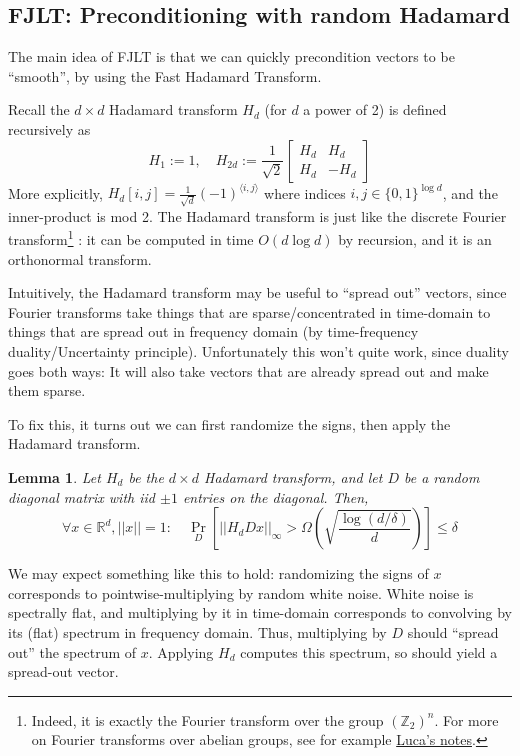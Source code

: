 \documentclass[]{article}
\newtheorem{lemma}{Lemma}
\newcommand{\1}{\mathbb{1}}
\newcommand{\x}{\times}
\newcommand{\Z}{\mathbb{Z}}
\newcommand{\R}{\mathbb{R}}
\renewcommand{\epsilon}{\varepsilon}
\newcommand{\bmqty}[1]{\begin{bmatrix}#1\end{bmatrix}}
\newcommand{\innp}[1]{\langle #1 \rangle}
\begin{document}

\subsection{FJLT: Preconditioning with random Hadamard}
The main idea of FJLT is that we can quickly precondition vectors to be
``smooth'', by using the Fast Hadamard Transform.

Recall the $d \x d$ Hadamard transform $H_d$ (for $d$ a power of 2) is defined
recursively as
$$H_1 :=  1
,\quad
H_{2d} := \frac{1}{\sqrt{2}} \bmqty{H_d & H_d\\H_d & -H_d}$$
More explicitly, $H_d[i,j] = \frac{1}{\sqrt{d}} (-1)^{\innp{i, j}}$
where indices $i,j \in \{0, 1\}^{\log d}$, and the inner-product is mod 2.
The Hadamard transform is just like the discrete Fourier transform\footnote{Indeed, it is exactly the Fourier transform over the group
    $(\Z_2)^n$. For more on Fourier transforms over abelian groups, see for
    example \href{https://lucatrevisan.wordpress.com/2016/03/16/cs294-lecture-15-abelian-cayley-graphs/}{Luca's
    notes}.}
: it can be computed in
time $O(d\log d)$ by recursion, and it is an orthonormal transform.

Intuitively, the Hadamard transform may be useful to ``spread out'' vectors,
since Fourier transforms take things that are sparse/concentrated in time-domain
to things that are spread out in frequency domain (by time-frequency duality/Uncertainty principle).
Unfortunately this won't quite work, since duality goes both ways: It will also
take vectors that are already spread out and make them sparse.

To fix this, it turns out we can first randomize the signs, then apply the
Hadamard transform.

\begin{lemma}
\label{lem:Hadamard}
Let $H_d$ be the $d \x d$ Hadamard transform, and let $D$ be a random
diagonal matrix with iid $\pm 1$ entries on the diagonal.
Then,
$$\forall x \in \R^d, ||x||=1: \quad
\Pr_{D}[
||H_d D x||_\infty >
\Omega(\sqrt{\frac{\log(d/\delta)}{d}})
]
\leq \delta$$
\end{lemma}

We may expect something like this to hold: randomizing the signs of $x$
corresponds to
pointwise-multiplying by random white noise. White noise is
spectrally flat, and multiplying by it in time-domain corresponds to
convolving by its (flat) spectrum in frequency domain.
Thus, multiplying by $D$ should ``spread out'' the spectrum of $x$.
Applying $H_d$ computes this spectrum, so should yield a spread-out vector.
\end{document}
